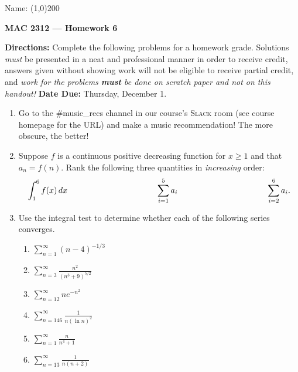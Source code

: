 \documentclass[12 pt]{article}
\begin{document}
\begin{flushright}Name: \line(1,0){200}\end{flushright}
\begin{center}
\Large{\textbf{MAC 2312 --- Homework 6}}
\end{center}
\textbf{Directions:} Complete the following problems for a homework grade. Solutions \textit{must} be presented in a neat and professional manner in order to receive credit, answers given without showing work will not be eligible to receive partial credit, and \textit{work for the problems \textbf{must} be done on scratch paper and not on this handout!} \textbf{Date Due:} Thursday, December 1.
\vspace{0.125in}
\begin{enumerate}[leftmargin=0in, rightmargin=-0.25in]
	\item Go to the \#music\_recs channel in our course's \textsc{Slack} room (see course homepage for the URL) and make a music recommendation! The more obscure, the better!
	\vspace{0.125in}
	
	\item Suppose $f$ is a continuous positive decreasing function for $x\geq 1$ and that $a_n=f(n)$. Rank the following three quantities in \textit{increasing} order:
	$$\int_1^6f(x)\,dx\hspace{1.5in}\sum_{i=1}^5 a_i\hspace{1.5in}\sum_{i=2}^6a_i.$$
	
	\item Use the integral test to determine whether each of the following series converges.
	\begin{multicols}{2}
		\begin{enumerate}
			\item $\sum_{n=1}^\infty (n-4)^{-1/3}$
			\item $\sum_{n=3}^\infty \frac{n^2}{(n^3+9)^{5/2}}$
			\item $\sum_{n=12}^\infty ne^{-n^2}$
			\item $\sum_{n=146}^\infty \frac{1}{n(\ln{n})^2}$
			\item $\sum_{n=1}^\infty\frac{n}{n^4+1}$
			\item $\sum_{n=13}^\infty\frac{1}{n(n+2)}$
		\end{enumerate}
	\end{multicols}
	\vspace{0.125in}
	

\end{enumerate}
\end{document}

